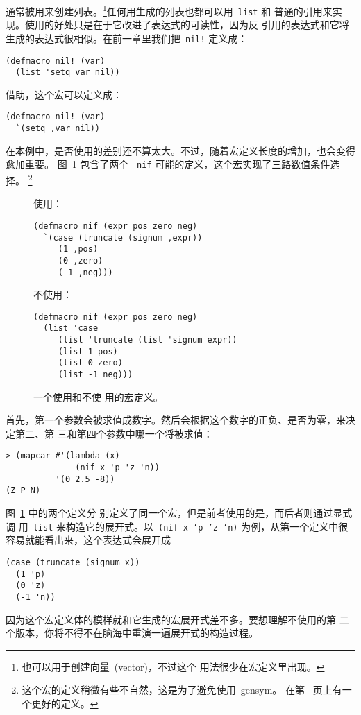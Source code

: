 \bq{}通常被用来创建列表。\footnote{\bq{}也可以用于创建向量~(vector)，不过这个
用法很少在宏定义里出现。}任何用\bq{}生成的列表也都可以用~\texttt{list} 和
普通的引用来实现。使用\bq{}的好处只是在于它改进了表达式的可读性，因为反
引用的表达式和它将生成的表达式很相似。在前一章里我们把~\texttt{nil!} 定义成：
\begin{lstlisting}
(defmacro nil! (var)
  (list 'setq var nil))
\end{lstlisting}
借助\bq{}，这个宏可以定义成：
\begin{lstlisting}
(defmacro nil! (var)
  `(setq ,var nil))
\end{lstlisting}
在本例中，是否使用\bq{}的差别还不算太大。不过，随着宏定义长度的增加，\bq{}也会变得愈加重要。
图~\ref{fig:a_macro_defined_with_and_without_backquote} 包含了两个
~\texttt{nif}\label{mac:nif}
可能的定义，这个宏实现了三路数值条件选择。
\footnote{这个宏的定义稍微有些不自然，这是为了避免使用~gensym。
在第~\pageref{fig:macros_for_conditional_evaluation} 页上有一个更好的定义。}

\begin{figure}
使用\bq{}：
\begin{lstlisting}
(defmacro nif (expr pos zero neg)
  `(case (truncate (signum ,expr))
     (1 ,pos)
     (0 ,zero)
     (-1 ,neg)))
\end{lstlisting}
不使用\bq{}：
\begin{lstlisting}
(defmacro nif (expr pos zero neg)
  (list 'case
     (list 'truncate (list 'signum expr))
     (list 1 pos)
     (list 0 zero)
     (list -1 neg)))
\end{lstlisting}
\caption{\label{fig:a_macro_defined_with_and_without_backquote}一个使用和不使
用\bq{}的宏定义。}
\end{figure}

首先，第一个参数会被求值成数字。然后会根据这个数字的正负、是否为零，来决定第二、第
三和第四个参数中哪一个将被求值：

\begin{lstlisting}
> (mapcar #'(lambda (x)
              (nif x 'p 'z 'n))
          '(0 2.5 -8))
(Z P N)
\end{lstlisting}

图~\ref{fig:a_macro_defined_with_and_without_backquote} 中的两个定义分
别定义了同一个宏，但是前者使用的是\bq{}，而后者则通过显式调
用~\texttt{list} 来构造它的展开式。以~\texttt{(nif x 'p 'z
  'n)} 为例，从第一个定义中很容易就能看出来，这个表达式会展开成
\begin{lstlisting}
(case (truncate (signum x))
  (1 'p)
  (0 'z)
  (-1 'n))
\end{lstlisting}
因为这个宏定义体的模样就和它生成的宏展开式差不多。要想理解不使用\bq{}的第
二个版本，你将不得不在脑海中重演一遍展开式的构造过程。

